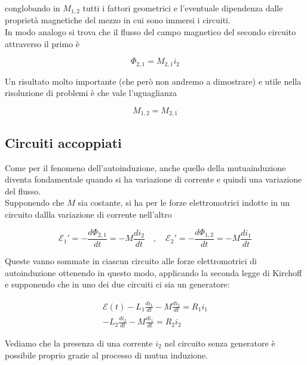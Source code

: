 conglobando in $M_{1,2}$ tutti i fattori geometrici e l'eventuale dipendenza dalle proprietà magnetiche del mezzo in cui sono immersi i circuiti. \\

In modo analogo si trova che il flusso del campo magnetico del secondo circuito attraverso il primo è 

\begin{tcolorbox}[colback=yellow!10!white, colframe=orange!70!black, boxrule=0.8pt]
\begin{equation}
    \Phi_{2,1} = M_{2,1} i_2
\end{equation}
\end{tcolorbox}

Un risultato molto importante (che però non andremo a dimostrare) e utile nella risoluzione di problemi è che vale l'uguaglianza 

\begin{tcolorbox}[colback=yellow!10!white, colframe=orange!70!black, boxrule=0.8pt]
\begin{equation}
    M_{1,2} = M_{2,1}
\end{equation}
\end{tcolorbox}

\subsection{Circuiti accoppiati}

Come per il fenomeno dell'autoinduzione, anche quello della mutuainduzione diventa fondamentale quando si ha variazione di corrente e quindi una variazione del flusso.\\

Supponendo che $M$ sia costante, si ha per le forze elettromotrici indotte in un circuito dallla variazione di corrente nell'altro

\begin{equation}
    \mathcal{E}_1' = - \frac{d \Phi_{2,1}}{dt} = - M \frac{di_2}{dt} \quad , \quad \mathcal{E}_2' = - \frac{d \Phi_{1,2}}{dt} = - M \frac{di_1}{dt}
\end{equation}

Queste vanno sommate in ciascun circuito alle forze elettromotrici di autoinduzione ottenendo in questo modo, applicando la seconda legge di Kirchoff e supponendo che in uno dei due circuiti ci sia un generatore:

\begin{tcolorbox}[colback=yellow!10!white, colframe=orange!70!black, boxrule=0.8pt]
\begin{align*}
    \mathcal{E}(t) - L_1 \frac{di_1}{dt} - M \frac{di_2}{dt} = R_1 i_1 \\
    - L_2 \frac{di_2}{dt} - M \frac{di_1}{dt} = R_2 i_2
\end{align*}
\end{tcolorbox}

Vediamo che la presenza di una corrente $i_2$ nel circuito senza generatore è possibile proprio grazie al processo di mutua induzione.


